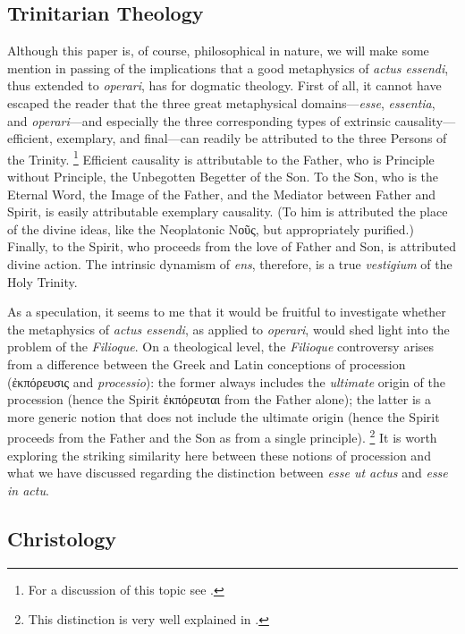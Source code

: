 \subsection{Trinitarian Theology}

Although this paper is, of course, philosophical in nature, we will make some mention in passing of the implications that a good metaphysics of \emph{actus essendi}, thus extended to \emph{operari}, has for dogmatic theology. First of all, it cannot have escaped the reader that the three great metaphysical domains—\emph{esse}, \emph{essentia}, and \emph{operari}—and especially the three corresponding types of extrinsic causality—efficient, exemplary, and final—can readily be attributed to the three Persons of the Trinity.%
%
\footnote{For a discussion of this topic see \cite[23–31]{contat:esse-essentia-ordo}.}
%
Efficient causality is attributable to the Father, who is Principle without Principle, the Unbegotten Begetter of the Son. To the Son, who is the Eternal Word, the Image of the Father, and the Mediator between Father and Spirit, is easily attributable exemplary causality. (To him is attributed the place of the divine ideas, like the Neoplatonic Νοῦς, but appropriately purified.) Finally, to the Spirit, who proceeds from the love of Father and Son, is attributed divine action. The intrinsic dynamism of \emph{ens}, therefore, is a true \emph{vestigium} of the Holy Trinity.

As a speculation, it seems to me that it would be fruitful to investigate whether the metaphysics of \emph{actus essendi}, as applied to \emph{operari}, would shed light into the problem of the \emph{Filioque}. On a theological level, the \emph{Filioque} controversy arises from a difference between the Greek and Latin conceptions of procession (ἐκπόρευσις and \emph{processio}): the former always includes the \emph{ultimate} origin of the procession (hence the Spirit ἐκπόρευται from the Father alone); the latter is a more generic notion that does not include the ultimate origin (hence the Spirit proceeds from the Father and the Son as from a single principle).%
%
\footnote{This distinction is very well explained in \cite{doc:processionhs}.}
%
It is worth exploring the striking similarity here between these notions of procession and what we have discussed regarding the distinction between \emph{esse ut actus} and \emph{esse in actu}.

\subsection{Christology}

